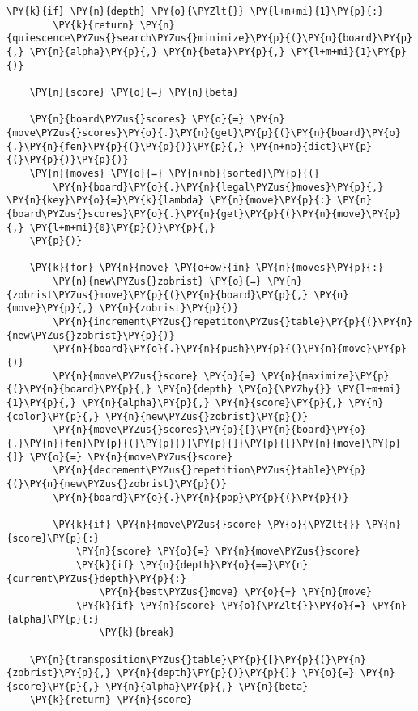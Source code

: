 \begin{tcolorbox}[fontupper=\linespread{.66}\selectfont, breakable, size=fbox, boxrule=1pt, pad at break*=1mm,colback=cellbackground, colframe=cellborder]
\begin{Verbatim}[commandchars=\\\{\}]
    \PY{k}{if} \PY{n}{depth} \PY{o}{\PYZlt{}} \PY{l+m+mi}{1}\PY{p}{:}
        \PY{k}{return} \PY{n}{quiescence\PYZus{}search\PYZus{}minimize}\PY{p}{(}\PY{n}{board}\PY{p}{,} \PY{n}{alpha}\PY{p}{,} \PY{n}{beta}\PY{p}{,} \PY{l+m+mi}{1}\PY{p}{)}
    
    \PY{n}{score} \PY{o}{=} \PY{n}{beta}
    
    \PY{n}{board\PYZus{}scores} \PY{o}{=} \PY{n}{move\PYZus{}scores}\PY{o}{.}\PY{n}{get}\PY{p}{(}\PY{n}{board}\PY{o}{.}\PY{n}{fen}\PY{p}{(}\PY{p}{)}\PY{p}{,} \PY{n+nb}{dict}\PY{p}{(}\PY{p}{)}\PY{p}{)}
    \PY{n}{moves} \PY{o}{=} \PY{n+nb}{sorted}\PY{p}{(}
        \PY{n}{board}\PY{o}{.}\PY{n}{legal\PYZus{}moves}\PY{p}{,} \PY{n}{key}\PY{o}{=}\PY{k}{lambda} \PY{n}{move}\PY{p}{:} \PY{n}{board\PYZus{}scores}\PY{o}{.}\PY{n}{get}\PY{p}{(}\PY{n}{move}\PY{p}{,} \PY{l+m+mi}{0}\PY{p}{)}\PY{p}{,}
    \PY{p}{)}

    \PY{k}{for} \PY{n}{move} \PY{o+ow}{in} \PY{n}{moves}\PY{p}{:}
        \PY{n}{new\PYZus{}zobrist} \PY{o}{=} \PY{n}{zobrist\PYZus{}move}\PY{p}{(}\PY{n}{board}\PY{p}{,} \PY{n}{move}\PY{p}{,} \PY{n}{zobrist}\PY{p}{)}
        \PY{n}{increment\PYZus{}repetiton\PYZus{}table}\PY{p}{(}\PY{n}{new\PYZus{}zobrist}\PY{p}{)}
        \PY{n}{board}\PY{o}{.}\PY{n}{push}\PY{p}{(}\PY{n}{move}\PY{p}{)}
        \PY{n}{move\PYZus{}score} \PY{o}{=} \PY{n}{maximize}\PY{p}{(}\PY{n}{board}\PY{p}{,} \PY{n}{depth} \PY{o}{\PYZhy{}} \PY{l+m+mi}{1}\PY{p}{,} \PY{n}{alpha}\PY{p}{,} \PY{n}{score}\PY{p}{,} \PY{n}{color}\PY{p}{,} \PY{n}{new\PYZus{}zobrist}\PY{p}{)}
        \PY{n}{move\PYZus{}scores}\PY{p}{[}\PY{n}{board}\PY{o}{.}\PY{n}{fen}\PY{p}{(}\PY{p}{)}\PY{p}{]}\PY{p}{[}\PY{n}{move}\PY{p}{]} \PY{o}{=} \PY{n}{move\PYZus{}score}
        \PY{n}{decrement\PYZus{}repetition\PYZus{}table}\PY{p}{(}\PY{n}{new\PYZus{}zobrist}\PY{p}{)}
        \PY{n}{board}\PY{o}{.}\PY{n}{pop}\PY{p}{(}\PY{p}{)}

        \PY{k}{if} \PY{n}{move\PYZus{}score} \PY{o}{\PYZlt{}} \PY{n}{score}\PY{p}{:}
            \PY{n}{score} \PY{o}{=} \PY{n}{move\PYZus{}score}
            \PY{k}{if} \PY{n}{depth}\PY{o}{==}\PY{n}{current\PYZus{}depth}\PY{p}{:}
                \PY{n}{best\PYZus{}move} \PY{o}{=} \PY{n}{move}
            \PY{k}{if} \PY{n}{score} \PY{o}{\PYZlt{}}\PY{o}{=} \PY{n}{alpha}\PY{p}{:}
                \PY{k}{break}

    \PY{n}{transposition\PYZus{}table}\PY{p}{[}\PY{p}{(}\PY{n}{zobrist}\PY{p}{,} \PY{n}{depth}\PY{p}{)}\PY{p}{]} \PY{o}{=} \PY{n}{score}\PY{p}{,} \PY{n}{alpha}\PY{p}{,} \PY{n}{beta}
    \PY{k}{return} \PY{n}{score}
\end{Verbatim}
\end{tcolorbox}

